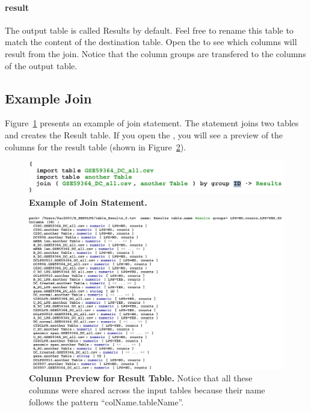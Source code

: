 \paragraph{result}
The output table is called Results by default. Feel free to rename this table to match the content of the destination table. Open the \inspectorTabIcon{} to see which columns will result from the join. Notice that the column groups are transfered to the columns of the output table.


\subsection{Example Join}
Figure~\ref{fig:ExampleJoinStatement} presents an example of join statement. The statement joins two tables and creates the Result table. If you open the \inspectorTabIcon{}, you will see a preview of the columns for the result table (shown in Figure~\ref{fig:ColumnPreviewExample}). 
\begin{figure}
  \centering
  \includegraphics[width=\figWidthNarrow]{figures/ExampleJoin.pdf}
\caption[Example of Join Statement.]{\textbf{Example of Join Statement.}}
\label{fig:ExampleJoinStatement}
\end{figure}


\begin{figure}[h!tbp]
  \centering
  \includegraphics[width=\figWidthWide]{figures/ExampleJoinColumnPreview.pdf}
\caption[Column Preview for Result Table.]{\textbf{Column Preview for Result Table.} Notice that all these columns were shared across the input tables because their name follows the pattern ``colName.tableName''.}
\label{fig:ColumnPreviewExample}
\end{figure}


